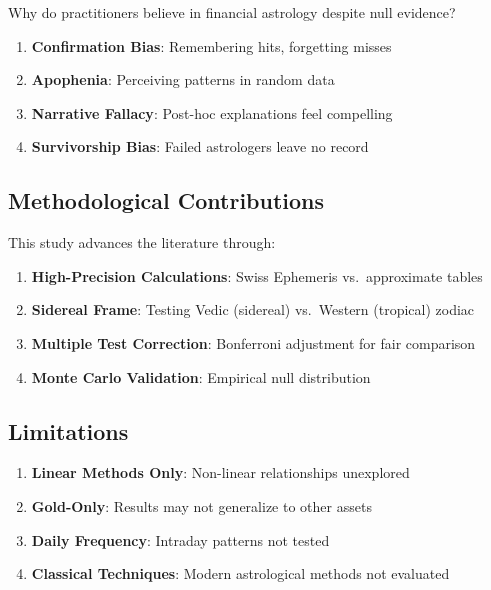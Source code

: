 \documentclass[
  11pt,
  a4paper,
  oneside,
  openany]{article}
\providecommand{\tightlist}{%
  \setlength{\itemsep}{0pt}\setlength{\parskip}{0pt}}\usepackage{longtable,booktabs,array}
\begin{document}
Why do practitioners believe in financial astrology despite null
evidence?

\begin{enumerate}
\def\labelenumi{\arabic{enumi}.}
\tightlist
\item
  \textbf{Confirmation Bias}: Remembering hits, forgetting misses
\item
  \textbf{Apophenia}: Perceiving patterns in random data
\item
  \textbf{Narrative Fallacy}: Post-hoc explanations feel compelling
\item
  \textbf{Survivorship Bias}: Failed astrologers leave no record
\end{enumerate}

\subsection{Methodological
Contributions}\label{methodological-contributions}

This study advances the literature through:

\begin{enumerate}
\def\labelenumi{\arabic{enumi}.}
\tightlist
\item
  \textbf{High-Precision Calculations}: Swiss Ephemeris vs.~approximate
  tables
\item
  \textbf{Sidereal Frame}: Testing Vedic (sidereal) vs.~Western
  (tropical) zodiac
\item
  \textbf{Multiple Test Correction}: Bonferroni adjustment for fair
  comparison
\item
  \textbf{Monte Carlo Validation}: Empirical null distribution
\end{enumerate}

\subsection{Limitations}\label{limitations}

\begin{enumerate}
\def\labelenumi{\arabic{enumi}.}
\tightlist
\item
  \textbf{Linear Methods Only}: Non-linear relationships unexplored
\item
  \textbf{Gold-Only}: Results may not generalize to other assets
\item
  \textbf{Daily Frequency}: Intraday patterns not tested
\item
  \textbf{Classical Techniques}: Modern astrological methods not
  evaluated
\end{enumerate}
\end{document}
